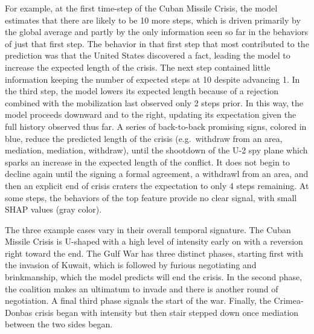 \documentclass[
  letterpaper,
  DIV=11,
  numbers=noendperiod]{scrartcl}
\begin{document}
For example, at the first time-step of the Cuban Missile Crisis, the
model estimates that there are likely to be 10 more steps, which is
driven primarily by the global average and partly by the only
information seen so far in the behaviors of just that first step. The
behavior in that first step that most contributed to the prediction was
that the United States discovered a fact, leading the model to increase
the expected length of the crisis. The next step contained little
information keeping the number of expected steps at 10 despite advancing
1. In the third step, the model lowers its expected length because of a
rejection combined with the mobilization last observed only 2 steps
prior. In this way, the model proceeds downward and to the right,
updating its expectation given the full history observed thus far. A
series of back-to-back promising signs, colored in blue, reduce the
predicted length of the crisis (e.g.~withdraw from an area, mediation,
mediation, withdraw), until the shootdown of the U-2 spy plane which
sparks an increase in the expected length of the conflict. It does not
begin to decline again until the signing a formal agreement, a withdrawl
from an area, and then an explicit end of crisis craters the expectation
to only 4 steps remaining. At some steps, the behaviors of the top
feature provide no clear signal, with small SHAP values (gray color).

The three example cases vary in their overall temporal signature. The
Cuban Missile Crisis is U-shaped with a high level of intensity early on
with a reversion right toward the end. The Gulf War has three distinct
phases, starting first with the invasion of Kuwait, which is followed by
furious negotiating and brinkmanship, which the model predicts will end
the crisis. In the second phase, the coalition makes an ultimatum to
invade and there is another round of negotiation. A final third phase
signals the start of the war. Finally, the Crimea-Donbas crisis began
with intensity but then stair stepped down once mediation between the
two sides began.
\end{document}
